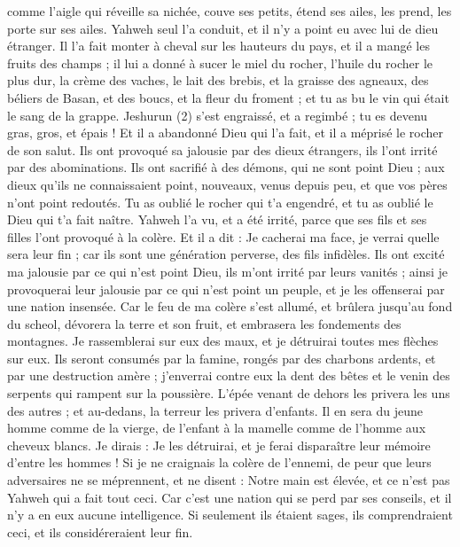 \begin{multicols}{2}
comme l'aigle qui réveille sa nichée, couve ses petits, étend ses ailes, les prend, les porte sur ses ailes.
Yahweh seul l'a conduit, et il n'y a point eu avec lui de dieu étranger.
Il l'a fait monter à cheval sur les hauteurs du pays, et il a mangé les fruits des champs ; il lui a donné à sucer le miel du rocher, l'huile du rocher le plus dur,
la crème des vaches, le lait des brebis, et la graisse des agneaux, des béliers de Basan, et des boucs, et la fleur du froment ; et tu as bu le vin qui était le sang de la grappe.
Jeshurun (2) s'est engraissé, et a regimbé ; tu es devenu gras, gros, et épais ! Et il a abandonné Dieu qui l'a fait, et il a méprisé le rocher de son salut.
Ils ont provoqué sa jalousie par des dieux étrangers, ils l'ont irrité par des abominations.
Ils ont sacrifié à des démons, qui ne sont point Dieu ; aux dieux qu'ils ne connaissaient point, nouveaux, venus depuis peu, et que vos pères n'ont point redoutés.
Tu as oublié le rocher qui t'a engendré, et tu as oublié le Dieu qui t'a fait naître.
Yahweh l'a vu, et a été irrité, parce que ses fils et ses filles l'ont provoqué à la colère.
Et il a dit : Je cacherai ma face, je verrai quelle sera leur fin ; car ils sont une génération perverse, des fils infidèles.
Ils ont excité ma jalousie par ce qui n'est point Dieu, ils m’ont irrité par leurs vanités ; ainsi je provoquerai leur jalousie par ce qui n'est point un peuple, et je les offenserai par une nation insensée.
Car le feu de ma colère s'est allumé, et brûlera jusqu'au fond du scheol, dévorera la terre et son fruit, et embrasera les fondements des montagnes.
Je rassemblerai sur eux des maux, et je détruirai toutes mes flèches sur eux.
Ils seront consumés par la famine, rongés par des charbons ardents, et par une destruction amère ; j'enverrai contre eux la dent des bêtes et le venin des serpents qui rampent sur la poussière.
L’épée venant de dehors les privera les uns des autres ; et au-dedans, la terreur les privera d’enfants. Il en sera du jeune homme comme de la vierge, de l'enfant à la mamelle comme de l'homme aux cheveux blancs.
Je dirais : Je les détruirai, et je ferai disparaître leur mémoire d'entre les hommes !
Si je ne craignais la colère de l’ennemi, de peur que leurs adversaires ne se méprennent, et ne disent : Notre main est élevée, et ce n’est pas Yahweh qui a fait tout ceci.
Car c’est une nation qui se perd par ses conseils, et il n'y a en eux aucune intelligence.
Si seulement ils étaient sages, ils comprendraient ceci, et ils considéreraient leur fin.

\end{multicols}
